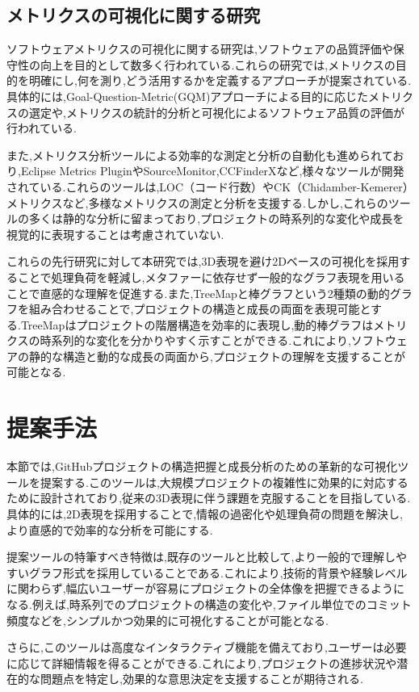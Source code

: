 \documentclass[12pt,twoside]{jbook}
\begin{document}
\section{メトリクスの可視化に関する研究}
ソフトウェアメトリクスの可視化に関する研究は,ソフトウェアの品質評価や保守性の向上を目的として数多く行われている\cite{aman2011software}.これらの研究では,メトリクスの目的を明確にし,何を測り,どう活用するかを定義するアプローチが提案されている.具体的には,Goal-Question-Metric(GQM)アプローチによる目的に応じたメトリクスの選定や,メトリクスの統計的分析と可視化によるソフトウェア品質の評価が行われている.

また,メトリクス分析ツールによる効率的な測定と分析の自動化も進められており,Eclipse Metrics PluginやSourceMonitor,CCFinderXなど,様々なツールが開発されている.これらのツールは,LOC（コード行数）やCK（Chidamber-Kemerer）メトリクスなど,多様なメトリクスの測定と分析を支援する.しかし,これらのツールの多くは静的な分析に留まっており,プロジェクトの時系列的な変化や成長を視覚的に表現することは考慮されていない.

これらの先行研究に対して本研究では,3D表現を避け2Dベースの可視化を採用することで処理負荷を軽減し,メタファーに依存せず一般的なグラフ表現を用いることで直感的な理解を促進する.また,TreeMapと棒グラフという2種類の動的グラフを組み合わせることで,プロジェクトの構造と成長の両面を表現可能とする.TreeMapはプロジェクトの階層構造を効率的に表現し,動的棒グラフはメトリクスの時系列的な変化を分かりやすく示すことができる.これにより,ソフトウェアの静的な構造と動的な成長の両面から,プロジェクトの理解を支援することが可能となる.

\chapter{提案手法}
本節では,GitHubプロジェクトの構造把握と成長分析のための革新的な可視化ツールを提案する.このツールは,大規模プロジェクトの複雑性に効果的に対応するために設計されており,従来の3D表現に伴う課題を克服することを目指している.具体的には,2D表現を採用することで,情報の過密化や処理負荷の問題を解決し,より直感的で効率的な分析を可能にする.

提案ツールの特筆すべき特徴は,既存のツールと比較して,より一般的で理解しやすいグラフ形式を採用していることである.これにより,技術的背景や経験レベルに関わらず,幅広いユーザーが容易にプロジェクトの全体像を把握できるようになる.例えば,時系列でのプロジェクトの構造の変化や,ファイル単位でのコミット頻度などを,シンプルかつ効果的に可視化することが可能となる.

さらに,このツールは高度なインタラクティブ機能を備えており,ユーザーは必要に応じて詳細情報を得ることができる.これにより,プロジェクトの進捗状況や潜在的な問題点を特定し,効果的な意思決定を支援することが期待される.
\end{document}
